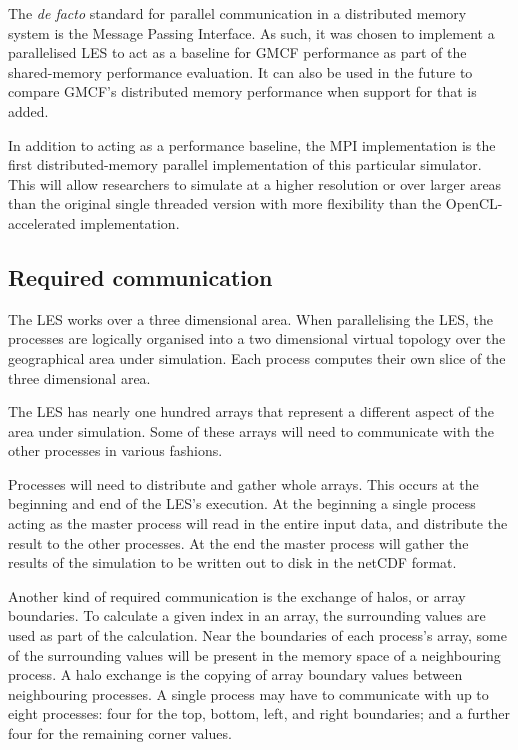 The \textit{de facto} standard for parallel communication in a distributed
memory system is the Message Passing Interface. As such, it was chosen to
implement a parallelised LES to act as a baseline for GMCF performance as part
of the shared-memory performance evaluation. It can also be used in the future
to compare GMCF's distributed memory performance when support for that is added.

In addition to acting as a performance baseline, the MPI implementation is the
first distributed-memory parallel implementation of this particular simulator.
This will allow researchers to simulate at a higher resolution or over larger
areas than the original single threaded version with more flexibility than the
OpenCL-accelerated implementation.

\subsection{Required communication}

The LES works over a three dimensional area. When parallelising the LES, the
processes are logically organised into a two dimensional virtual topology over
the geographical area under simulation. Each process computes their own slice of
the three dimensional area.

The LES has nearly one hundred arrays that represent a different aspect of the
area under simulation. Some of these arrays will need to communicate with the
other processes in various fashions.

Processes will need to distribute and gather whole arrays. This occurs at the
beginning and end of the LES's execution. At the beginning a single process
acting as the master process will read in the entire input data, and distribute
the result to the other processes. At the end the master process will gather the
results of the simulation to be written out to disk in the netCDF format.

Another kind of required communication is the exchange of halos, or array
boundaries. To calculate a given index in an array, the surrounding values are
used as part of the calculation. Near the boundaries of each process's array,
some of the surrounding values will be present in the memory space of a
neighbouring process. A halo exchange is the copying of array boundary values
between neighbouring processes. A single process may have to communicate with up
to eight processes: four for the top, bottom, left, and right boundaries; and a
further four for the remaining corner values.

